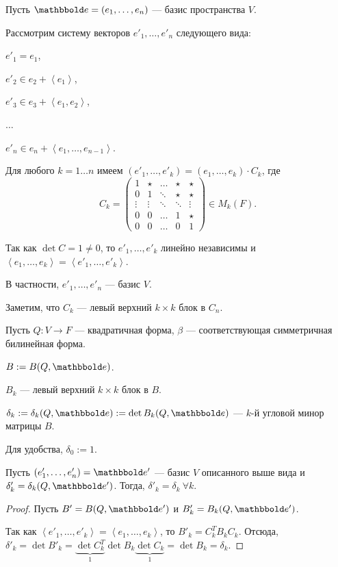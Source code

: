 Пусть $\E = (e_1, \dots, e_n)$ --- базис пространства $V$.

Рассмотрим систему векторов $e'_1, \dots, e'_n$ следующего вида:

$e'_1 = e_1$,

$e'_2 \in e_2 + \left< e_1 \right>$,

$e'_3 \in e_3 + \left< e_1, e_2 \right>$,

$\dots$

$e'_n \in e_n + \left< e_1, \dots, e_{n - 1} \right>$.

Для любого $k = 1 \dots n$ имеем $(e'_1, \dots, e'_k) = (e_1, \dots, e_k) \cdot C_k$, где
\begin{equation*}
    C_k = \begin{pmatrix} 
        1 & \star & \dots & \star & \star \\
        0 & 1 & \ddots & \star & \star \\
        \vdots & \vdots & \ddots & \ddots & \vdots \\
        0 & 0 & \dots & 1 & \star \\
        0 & 0 & \dots & 0 & 1
    \end{pmatrix} \in M_k(F)
.\end{equation*}

Так как $\det C = 1 \neq 0$, то $e'_1, \dots, e'_k$ линейно независимы и $\left< e_1, \dots, e_k \right> = \left< e'_1, \dots, e'_k \right>$.

В частности, $e'_1, \dots, e'_n$ --- базис $V$.

Заметим, что $C_k$ --- левый верхний $k \times k$ блок в $C_n$.

Пусть $Q \colon V \to F$ --- квадратичная форма, $\beta$ --- соответствующая симметричная билинейная форма.

$B := B(Q, \E)$.

$B_k$ --- левый верхний $k \times k$ блок в $B$.

$\delta_k := \delta_k(Q, \E) := \det B_k(Q, \E)$ --- $k$-й угловой минор матрицы $B$.

Для удобства, $\delta_0 := 1$.

\begin{lemma}
    Пусть $(e'_1, \dots, e'_n) = \E'$ --- базис $V$ описанного выше вида и $\delta'_k = \delta_k(Q, \E')$. Тогда, $\delta'_k = \delta_k \ \forall k$.
\end{lemma}

\begin{proof}
    Пусть $B' = B(Q, \E')$ и $B'_k = B_k(Q, \E')$.

    Так как $\left< e'_1, \dots, e'_k \right> = \left< e_1, \dots, e_k \right>$, то $B'_k = C_k^T B_k C_k$.
    Отсюда, $\delta'_k = \det B'_k = \underbrace{\det C_k^T}_1 \det B_k \underbrace{\det C_k}_1 = \det B_k = \delta_k$.
\end{proof}


